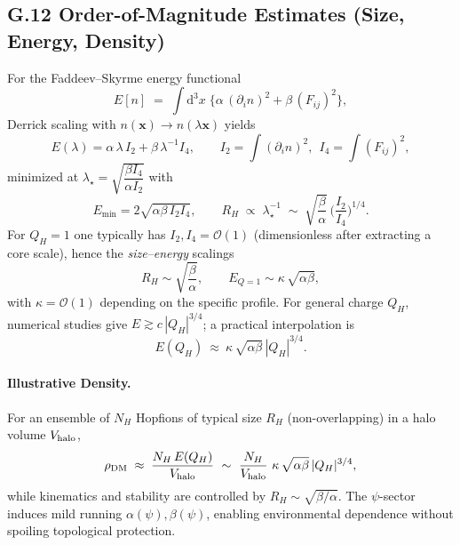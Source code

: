 \documentclass[12pt,a4paper]{article}
\begin{document}
\subsection*{G.12 Order-of-Magnitude Estimates (Size, Energy, Density)}
For the Faddeev--Skyrme energy functional
\begin{equation}
E[n] \;=\; \int\!\mathrm{d}^3x\;\Big\{\alpha\, (\partial_i n)^2 + \beta\, (F_{ij})^2\Big\},
\end{equation}
Derrick scaling with $n(\mathbf{x})\to n(\lambda \mathbf{x})$ yields
\begin{equation}
E(\lambda)= \alpha\, \lambda\, I_2 + \beta\, \lambda^{-1} I_4,\qquad
I_2=\!\int\! (\partial_i n)^2,\ \ I_4=\!\int\! (F_{ij})^2,
\end{equation}
minimized at $\lambda_\star=\sqrt{\dfrac{\beta I_4}{\alpha I_2}}$ with
\begin{equation}
E_{\min}=2\sqrt{\alpha\beta\, I_2 I_4},\qquad
R_H \;\propto\; \lambda_\star^{-1} \;\sim\; \sqrt{\frac{\beta}{\alpha}}\, \Big(\frac{I_2}{I_4}\Big)^{1/4}.
\end{equation}
For $Q_H=1$ one typically has $I_2,I_4=\mathcal{O}(1)$ (dimensionless after extracting a core scale), hence the \emph{size--energy} scalings
\begin{equation}
R_H \sim \sqrt{\frac{\beta}{\alpha}},\qquad E_{Q=1} \sim \kappa\, \sqrt{\alpha\beta},
\end{equation}
with $\kappa=\mathcal{O}(1)$ depending on the specific profile. For general charge $Q_H$, numerical studies give $E \gtrsim c\,|Q_H|^{3/4}$; a practical interpolation is
\begin{equation}
E(Q_H)\ \approx\ \kappa\, \sqrt{\alpha\beta}\, |Q_H|^{3/4}.
\end{equation}
\paragraph{Illustrative Density.} For an ensemble of $N_H$ Hopfions of typical size $R_H$ (non-overlapping) in a halo volume $V_{\rm halo}$,
\begin{equation}
\rho_{\rm DM} \;\approx\; \frac{N_H\, E(Q_H)}{V_{\rm halo}} \ \sim\  \frac{N_H}{V_{\rm halo}}\ \kappa\, \sqrt{\alpha\beta}\, |Q_H|^{3/4},
\end{equation}
while kinematics and stability are controlled by $R_H\!\sim\!\sqrt{\beta/\alpha}$. The $\psi$-sector induces mild running $\alpha(\psi),\beta(\psi)$, enabling environmental dependence without spoiling topological protection.
\end{document}
